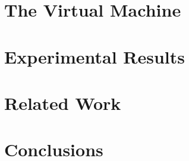 \documentclass{acm_proc_article-sp}
\begin{document}
\section{The Virtual Machine}\label{virtual_machine}


\section{Experimental Results}\label{results}


\section{Related Work}\label{related_work}


\section{Conclusions}




\end{document}
